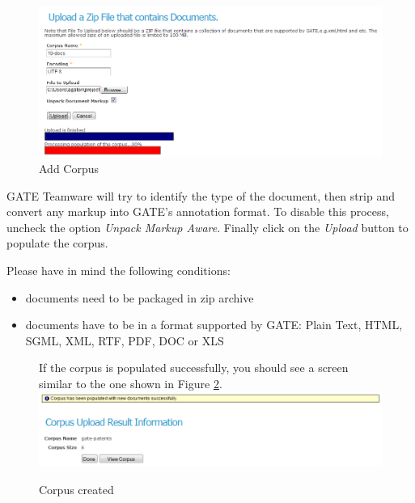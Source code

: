 \begin{figure}[h]
\centering
\includegraphics[scale=0.5]{populatecorpus}
\caption{Add Corpus }
\label{fig:addcorpus}
\end{figure}

GATE Teamware will try to identify the type of the document, then strip
and convert any markup into GATE's annotation format. To disable this process,
uncheck the option \emph{Unpack Markup Aware}. Finally click on the
\emph{Upload} button to populate the corpus.

Please have in mind the following conditions:
\begin{itemize}
\item documents need to be packaged in zip archive
\item documents have to be in a format supported by GATE:
Plain Text, HTML, SGML, XML, RTF, PDF, DOC or XLS
	
\end{itemize}
\begin{figure}
If the corpus is populated successfully, you should see a screen similar to the
one shown in Figure \ref{fig:corpuspopulated}.
\centering
\includegraphics[scale=0.4]{corpuspopulated}
\caption{Corpus created}
\label{fig:corpuspopulated}
\end{figure}


